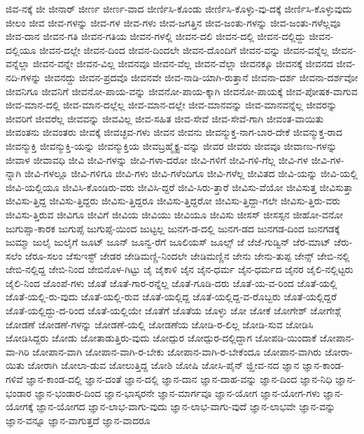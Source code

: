 {ಜಿವ-ನಕ್ಕೆ
ಜೀ
ಜೀನಾರ್
ಜೀರ್ಣ
ಜೀರ್ಣ-ವಾದ
ಜೀರ್ಣಿಸಿ-ಕೊಂಡು
ಜೀರ್ಣಿಸಿ-ಕೊಳ್ಳು-ವು-ದಕ್ಕೆ
ಜೀರ್ಣಿಸಿ-ಕೊಳ್ಳುವುದು
ಜೀಲಂ
ಜೀವ
ಜೀವ-ಗಳನ್ನು
ಜೀವ-ಗಳ
ಜೀವ-ಗಳು
ಜೀವ-ಜಗತ್ತಿನ
ಜೀವ-ಜಂತು-ಗಳನ್ನು
ಜೀವ-ಜಂತು-ಗಳೆಲ್ಲವೂ
ಜೀವ-ದಾನ
ಜೀವನ-ಗತಿ
ಜೀವನ-ಗತಿಯ
ಜೀವನ-ಗಳಲ್ಲಿ
ಜೀವನ-ದಲಿ
ಜೀವನ-ದಲ್ಲಿ
ಜೀವನ-ದಲ್ಲಿದ್ದು
ಜೀವನ-ದಲ್ಲಿಯೂ
ಜೀವನ-ದಲ್ಲೇ
ಜೀವನ-ದಿಂದ
ಜೀವನ-ದಿಂದಲೇ
ಜೀವನ-ದೊಂದಿಗೆ
ಜೀವನ-ವನ್ನು
ಜೀವನ-ವನ್ನೆಲ್ಲ
ಜೀವನ-ವನ್ನೆಲ್ಲಾ
ಜೀವನ-ವನ್ನೇ
ಜೀವನ-ವಿಲ್ಲ
ಜೀವನವೂ
ಜೀವನ-ವೆಲ್ಲ
ಜೀವನ-ವೆಲ್ಲಾ
ಜೀವನಕ್ಕೂ
ಜೀವನಕ್ಕೆ
ಜೀವನದ
ಜೀವ-ನದಿ-ಗಳನ್ನು
ಜೀವನದ್ದು
ಜೀವನ-ಪ್ರದವೊ
ಜೀವನವೇ
ಜೀವ-ನಾಡಿ-ಯಾಗಿ-ರುತ್ತಾನೆ
ಜೀವನಾ-ದರ್ಶ
ಜೀವನಾ-ದರ್ಶವೋ
ಜೀವನಿಗೂ
ಜೀವನಿಗೆ
ಜೀವನೋ-ಪಾಯ-ವನ್ನು
ಜೀವನೋ-ಪಾಯ-ಕ್ಕಾಗಿ
ಜೀವನೋ-ಪಾಯಕ್ಕೆ
ಜೀವ-ಪೋಷಕ-ವಾಗುವ
ಜೀವ-ಮಾನ-ದಲ್ಲಿ
ಜೀವ-ಮಾನ-ದಲ್ಲೆಲ್ಲ
ಜೀವ-ಮಾನ-ದಲ್ಲೇ
ಜೀವ-ಮಾನವನ್ನು
ಜೀವ-ಮಾನವನ್ನೆಲ್ಲ
ಜೀವರನ್ನು
ಜೀವರಿಗೆ
ಜೀವರೆಲ್ಲ
ಜೀವವನ್ನು
ಜೀವವಿಲ್ಲ
ಜೀವ-ಸಹಿತ
ಜೀವ-ಸೇವೆ
ಜೀವ-ಸೇವೆ-ಗಾಗಿ
ಜೀವಂತ-ವಾಯಿತು
ಜೀವಂತನು
ಜೀವಂತರು
ಜೀವಕ್ಕೆ
ಜೀವಚ್ಛವ-ಗಳು
ಜೀವನ
ಜೀವನು
ಜೀವನ್ಮುಕ್ತ-ನಾಗ-ಬಾರ-ದೇಕೆ
ಜೀವನ್ಮುಕ್ತ-ರಾದ
ಜೀವನ್ಮುಕ್ತಿ
ಜೀವನ್ಮುಕ್ತಿ-ಯನ್ನು
ಜೀವನ್ಮುಕ್ತಿಯ
ಜೀವಬ್ರಹ್ಮೈಕ್ಯ-ವನ್ನು
ಜೀವರ
ಜೀವರು
ಜೀವವೂ
ಜೀವಾಣು-ಗಳನ್ನು
ಜೀವಾಳ
ಜೀವಾವಧಿ
ಜೀವಿ
ಜೀವಿ-ಗಳನ್ನು
ಜೀವಿ-ಗಳಾ-ದರೋ
ಜೀವಿ-ಗಳಿಗೆ
ಜೀವಿ-ಗಳಿ-ಗೆಲ್ಲ
ಜೀವಿ-ಗಳ
ಜೀವಿ-ಗಳ-ನ್ನಾಗಿ
ಜೀವಿ-ಗಳಲ್ಲೂ
ಜೀವಿ-ಗಳಿಗೂ
ಜೀವಿ-ಗಳು
ಜೀವಿ-ಗಳೆಂದಿಗೂ
ಜೀವಿ-ಗಳೆಲ್ಲ
ಜೀವಿತದ
ಜೀವಿ-ಯನ್ನು
ಜೀವಿ-ಯಲ್ಲಿ
ಜೀವಿ-ಯಲ್ಲಿಯೂ
ಜೀವಿಸಿ-ಕೊಂಡಿರು-ವರು
ಜೀವಿಸಿ-ದ್ದರೆ
ಜೀವಿ-ಸಿರು-ತ್ತಾರೆ
ಜೀವಿಸು-ವೆಯೋ
ಜೀವಿಸುತ್ತ
ಜೀವಿಸುತ್ತಾ
ಜೀವಿಸು-ತ್ತಿದ್ದ
ಜೀವಿಸು-ತ್ತಿದ್ದರು
ಜೀವಿಸು-ತ್ತಿದ್ದರೂ
ಜೀವಿಸು-ತ್ತಿದ್ದರೋ
ಜೀವಿಸು-ತ್ತಿದ್ದಾ-ಗಲೇ
ಜೀವಿಸು-ತ್ತಿರು-ವರು
ಜೀವಿಸು-ತ್ತಿರುವ
ಜೀವಿಗೂ
ಜೀವಿಗೆ
ಜೀವಿಯ
ಜೀವಿಯು
ಜೀವಿಯೂ
ಜೀವಿಸು
ಜೀಸಸ್
ಜೀಸಸ್ಸನ
ಜೀಹೋ-ವನೋ
ಜುಗುಪ್ಸಾ-ಕಾರಕ
ಜುಗುಪ್ಸೆ
ಜುಗುಪ್ಸೆ-ಯಿಂದ
ಜುಟ್ಟಲ್ಲ
ಜುನಗ-ಡ-ದಲ್ಲಿ
ಜುನಗ-ಡದ
ಜುನಗಡ-ದಿಂದ
ಜುನಗಡಕ್ಕೆ
ಜುಮ್ಮಾ
ಜುಲೈ
ಜುಲೈಗೆ
ಜೂಟ್
ಜೂನ್
ಜೂನ್ವ-ರೆಗೆ
ಜೂಲಿಯಸ್
ಜೂಲ್ಸ್
ಜೆ
ಜೆಜೆ-ಗುಡ್ವಿನ್
ಜೆರ-ಮಾಟ್
ಜೆರು-ಸಲೆಂ
ಜೆರೂ-ಸಲಂ
ಜೆಸುಇಸ್ಟ್
ಜೇಡರ
ಜೇಡಿಮಣ್ಣಿ-ನಿಂದಲೇ
ಜೇಡಿಮಣ್ಣಿನ
ಜೇನು
ಜೇನು-ತುಪ್ಪ
ಜೇನ್ಸ್
ಜೇಬಿ-ನಲ್ಲಿ
ಜೇಬಿ-ನಲ್ಲಿದ್ದ
ಜೇಬಿ-ನಿಂದ
ಜೇಬಿನೊಳ-ಗಿಟ್ಟು
ಜೈ
ಜೈಕಾಳಿ
ಜೈನ
ಜೈನ-ಧರ್ಮ
ಜೈನ-ಧರ್ಮದ
ಜೈನರ
ಜೈಲಿ-ನಲ್ಲಿಟ್ಟರು
ಜೈಲಿ-ನಿಂದ
ಜೊಂಪೆ-ಗಳು
ಜೊತೆ
ಜೊತೆ-ಗಾರ-ರನ್ನೆಲ್ಲ
ಜೊತೆ-ಗೂಡಿ-ದರು
ಜೊತೆ-ಯ-ವ-ರಿಂದ
ಜೊತೆ-ಯಲ್ಲಿ
ಜೊತೆ-ಯಲ್ಲಿ-ರು-ವುದು
ಜೊತೆ-ಯಲ್ಲಿ-ರುವ
ಜೊತೆ-ಯಲ್ಲಿದ್ದ
ಜೊತೆ-ಯಲ್ಲಿದ್ದ-ವ-ರೊಬ್ಬರು
ಜೊತೆ-ಯಲ್ಲಿದ್ದರೆ
ಜೊತೆ-ಯಲ್ಲಿದ್ದು-ದ-ರಿಂದ
ಜೊತೆ-ಯಲ್ಲಿಯೇ
ಜೊತೆಗೆ
ಜೊತೆಯ
ಜೊಳ್ಳು
ಜೋ
ಜೋಕೆ
ಜೋಗೇಶ್
ಜೋಗೇಶ್ಗೆ
ಜೋಡಣೆ
ಜೋಡಣೆ-ಗಳನ್ನು
ಜೋಡಣೆ-ಯಲ್ಲಿ
ಜೋಡಣೆಯ
ಜೋಡಿ-ರ-ಲಿಲ್ಲ
ಜೋಡಿ-ಸುವ
ಜೋಡಿಸಿ
ಜೋಡಿಸಿದ್ದರು
ಜೋಡು
ಜೋತಾಡುತ್ತಿರು-ವುದು
ಜೋದ್ಪುರ
ಜೋದ್ಪುರ-ದಲ್ಲಿದ್ದಾಗ
ಜೋಪಡಿ-ಯಿಂದಾಕೆ
ಜೋಪಾನ-ವಾ-ಗಿರಿ
ಜೋಪಾನ-ವಾಗಿ
ಜೋಪಾನ-ವಾಗಿ-ರ-ಬೇಕು
ಜೋಪಾನ-ವಾಗಿ-ರ-ಬೇಕೆಂದೂ
ಜೋಪಾನ-ವಾಗಿರು
ಜೋರಾ-ಯಿತು
ಜೋರಾಗಿ
ಜೋಲಾ-ಡುವ
ಜೋಲುತ್ತಿದ್ದ
ಜೋಶಿ
ಜೋಷಿ
ಜೋಸಿ-ಪೈನ್
ಜ್ಝೀವ-ನದ
ಜ್ಞಾನ
ಜ್ಞಾನ-ಕಾಂಡ-ಗಳಿವೆ
ಜ್ಞಾನ-ಕಾಂಡ-ದಲ್ಲಿ
ಜ್ಞಾನ-ದಂತೆ
ಜ್ಞಾನ-ದಲ್ಲಿ
ಜ್ಞಾನ-ದಾನ
ಜ್ಞಾನ-ದಾಹ-ವನ್ನು
ಜ್ಞಾನ-ದಿಂದ
ಜ್ಞಾನ-ನಿಧಿ
ಜ್ಞಾನ-ಭಂಡಾರ
ಜ್ಞಾನ-ಭಂಡಾರ-ದಿಂದ
ಜ್ಞಾನ-ಭಾಸ್ಕರನೇ
ಜ್ಞಾನ-ಮಾರ್ಗವೂ
ಜ್ಞಾನ-ಯೋಗ
ಜ್ಞಾನ-ಯೋಗ-ಗಳು
ಜ್ಞಾನ-ಯೋಗಕ್ಕೆ
ಜ್ಞಾನ-ಯೋಗದ
ಜ್ಞಾನ-ಲಾಭ-ವಾಗು-ವುದು
ಜ್ಞಾನ-ಲಾಭ-ವಾಗು-ವುದೆ
ಜ್ಞಾನ-ಲಾಭವೇ
ಜ್ಞಾನ-ವನ್ನು
ಜ್ಞಾನ-ವನ್ನೂ
ಜ್ಞಾನ-ವಾಗುತ್ತದೆ
ಜ್ಞಾನ-ವಾದರೂ
}
